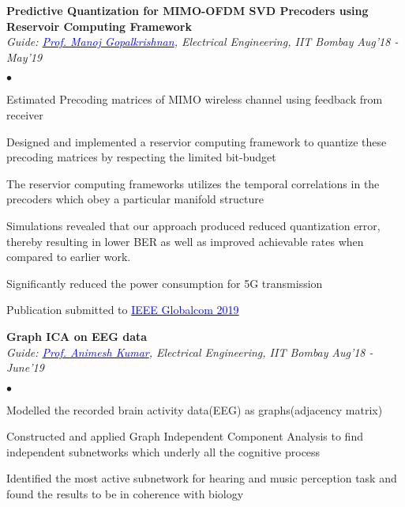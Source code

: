 \documentclass[margin,line]{res}
\newenvironment{list2}{
  \begin{list}{$\bullet$}{%
      \setlength{\itemsep}{0.03in}
      \setlength{\parsep}{0in} \setlength{\parskip}{0in}
      \setlength{\topsep}{0in} \setlength{\partopsep}{0in} 
      \setlength{\leftmargin}{0.2in}}}{\end{list}}
\begin{document}
\begin{resume}
{\bf Predictive Quantization for MIMO-OFDM SVD Precoders using Reservoir Computing Framework} \\
{\em Guide: \href{https://www.ee.iitb.ac.in/web/people/faculty/home/manojg}{\textcolor{blue}{Prof. Manoj Gopalkrishnan}}, Electrical Engineering, IIT Bombay} \hfill {\it Aug'18 - May'19}\\
\vspace*{-.13in}
\begin{list2}
\item Estimated Precoding matrices of MIMO wireless channel using feedback from receiver
\item Designed and implemented a reservior computing framework to quantize these precoding matrices by respecting the limited bit-budget
\item The reservior computing frameworks utilizes the temporal correlations in the precoders which obey a particular manifold structure
\item Simulations revealed that our approach produced reduced quantization error, thereby resulting in lower BER as well as improved achievable rates when compared to earlier work.
\item Significantly reduced the power consumption for 5G transmission
\item Publication submitted to \href{https://globecom2019.ieee-globecom.org}{\textcolor{blue} {IEEE Globalcom 2019}}
\end{list2}

{\bf Graph ICA on EEG data} \\
{\em Guide: \href{https://www.ee.iitb.ac.in/~animesh/}{\textcolor{blue}{Prof. Animesh Kumar}}, Electrical Engineering, IIT Bombay} \hfill {\it Aug'18 - June'19}\\
\vspace*{-.13in}
\begin{list2}
\item Modelled the recorded brain activity data(EEG) as graphs(adjacency matrix)
\item Constructed and applied Graph Independent Component Analysis to find independent subnetworks which underly all the cognitive process
\item Identified the most active subnetwork for hearing and music perception task and found the results to be in coherence with biology
\end{list2}



\end{resume}
\end{document}

